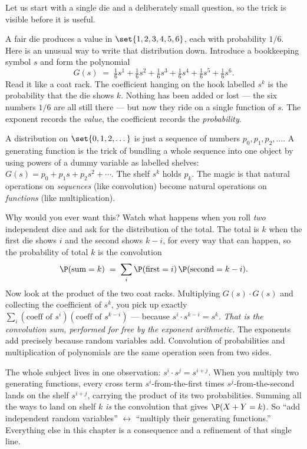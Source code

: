 Let us start with a single die and a deliberately small question, so the trick
is visible before it is useful.

A fair die produces a value in $\set{1,2,3,4,5,6}$, each with probability
$1/6$. Here is an unusual way to write that distribution down. Introduce a
bookkeeping symbol $s$ and form the polynomial
\[
  G(s) \;=\; \tfrac16 s^1 + \tfrac16 s^2 + \tfrac16 s^3
            + \tfrac16 s^4 + \tfrac16 s^5 + \tfrac16 s^6 .
\]
Read it like a coat rack. The coefficient hanging on the hook labelled $s^k$ is
the probability that the die shows $k$. Nothing has been added or lost --- the
six numbers $1/6$ are all still there --- but now they ride on a single
function of $s$. The exponent records the \emph{value}, the coefficient records
the \emph{probability}.

\begin{intuitionbox}
A distribution on $\set{0,1,2,\dots}$ is just a sequence of numbers
$p_0,p_1,p_2,\dots$. A generating function is the trick of bundling a whole
sequence into one object by using powers of a dummy variable as labelled
shelves: $G(s)=p_0 + p_1 s + p_2 s^2 + \cdots$. The shelf $s^k$ holds $p_k$.
The magic is that natural operations on \emph{sequences} (like convolution)
become natural operations on \emph{functions} (like multiplication).
\end{intuitionbox}

Why would you ever want this? Watch what happens when you roll \emph{two}
independent dice and ask for the distribution of the total. The total is $k$
when the first die shows $i$ and the second shows $k-i$, for every way that can
happen, so the probability of total $k$ is the convolution
\[
  \P(\text{sum}=k) \;=\; \sum_{i} \P(\text{first}=i)\,\P(\text{second}=k-i).
\]
Now look at the product of the two coat racks. Multiplying $G(s)\cdot G(s)$ and
collecting the coefficient of $s^k$, you pick up exactly
$\sum_i (\text{coeff of }s^i)(\text{coeff of }s^{k-i})$ --- because $s^i \cdot
s^{k-i}=s^k$. \emph{That is the convolution sum, performed for free by the
exponent arithmetic.} The exponents add precisely because random variables add.
Convolution of probabilities and multiplication of polynomials are the same
operation seen from two sides.

\begin{happeningbox}
The whole subject lives in one observation: $s^i\cdot s^j = s^{i+j}$. When you
multiply two generating functions, every cross term $s^i$-from-the-first times
$s^j$-from-the-second lands on the shelf $s^{i+j}$, carrying the product of its
two probabilities. Summing all the ways to land on shelf $k$ \emph{is} the
convolution that gives $\P(X+Y=k)$. So ``add independent random variables''
$\longleftrightarrow$ ``multiply their generating functions.'' Everything else
in this chapter is a consequence and a refinement of that single line.
\end{happeningbox}

